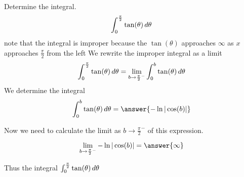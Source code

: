 \documentclass{ximera}
\author{Jason Miller}
\begin{document}
\begin{exercise}
Determine the integral.
\[
\int_{0}^{\frac{\pi}{2}} \tan(\theta) \mathop{}\!d \theta 
\]
note that the integral is improper because the $\tan(\theta)$
approaches $\infty$ as $x$ approaches $\frac{\pi}{2}$ from the left We
rewrite the improper integral as a limit
\[
\int_{0}^{\frac{\pi}{2}} \tan(\theta) \mathop{}\!d \theta=\lim_{b \to {\frac{\pi}{2}}^{-}} \int_{0}^{b} \tan(\theta) \mathop{}\!d \theta
\]
We determine the integral
\[
\int_{0}^{b} \tan(\theta) \d \theta= \answer{-\ln|\cos(b)| }
\]

\begin{exercise}
Now we need to calculate the limit as $b \to {\frac{\pi}{2}}^{-}$ of this expression. 

\[
\lim_{b \to {\frac{\pi}{2}}^{-}} -\ln| \cos(b) |= \answer{  \infty }
\]

\begin{exercise}
Thus the integral $\int_{0}^{\frac{\pi}{2}} \tan(\theta) \mathop{}\!d \theta$ 

\begin{multipleChoice}
\end{multipleChoice}




\end{exercise}
\end{exercise}
\end{exercise}
\end{document}
